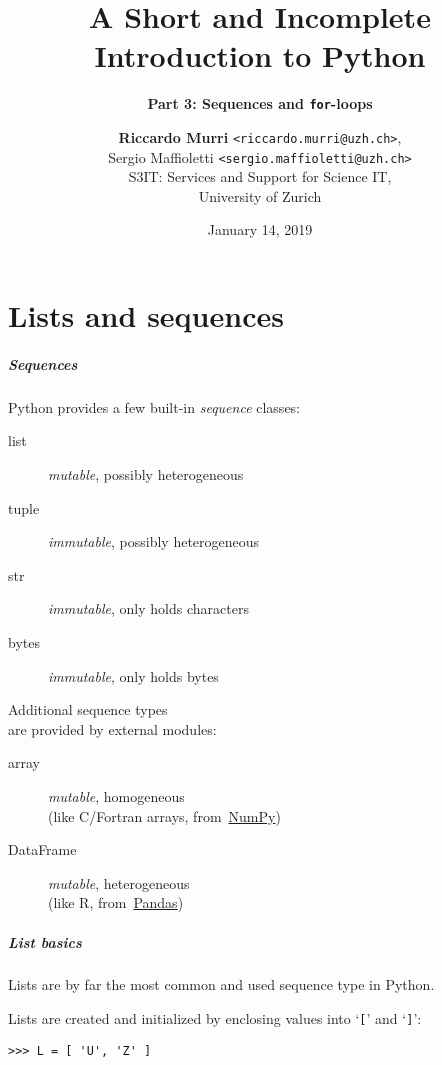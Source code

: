 \documentclass[english,serif,mathserif,xcolor=pdftex,dvipsnames,table]{beamer}
\title[3. Sequences and loops]{%
  A Short and Incomplete Introduction to Python
}
\subtitle{\bfseries Part 3: Sequences and \texttt{for}-loops}
\author[R.~Murri]{%
  \textbf{Riccardo Murri} \texttt{<riccardo.murri@uzh.ch>}, \\
  Sergio Maffioletti \texttt{<sergio.maffioletti@uzh.ch>}
  \\
  S3IT: Services and Support for Science IT,
  \\
  University of Zurich
}
\date{January 14, 2019}
\begin{document}
\maketitle


\part{Lists and sequences}

\begin{frame}
  \frametitle{Sequences}

  Python provides a few built-in \emph{sequence} classes:
  \begin{description}
  \item[list] \emph{mutable}, possibly heterogeneous
  \item[tuple] \emph{immutable}, possibly heterogeneous
  \item[str] \emph{immutable}, only holds characters
  \item[bytes] \emph{immutable}, only holds bytes
  \end{description}

  \+
  Additional sequence types \\ are provided by external modules:
  \begin{description}
  \item[array] \emph{mutable}, homogeneous \\ (like C/Fortran arrays,
    from~\href{http://numpy.scipy.org}{NumPy})
  \item[DataFrame] \emph{mutable}, heterogeneous \\ (like R,
    from~\href{http://pandas.pydata.org/}{Pandas})
  \end{description}

\end{frame}


\begin{frame}[fragile]
  \frametitle{List basics}
  Lists are by far the most common and used sequence type in Python.

  \+
  Lists are created and initialized by enclosing values into
  `\texttt{[}' and `\texttt{]}':
\begin{lstlisting}
>>> L = [ 'U', 'Z' ]
\end{lstlisting}

\end{frame}
\end{document}
